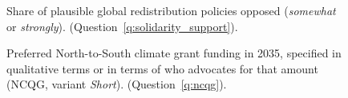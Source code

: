 \begin{figure}[h!]
    \caption[Share of plausible global policies opposed]{Share of plausible global redistribution policies opposed (\textit{somewhat} or \textit{strongly}). (Question~\ref{q:solidarity_support}).
    }\label{fig:share_solidarity_opposed}
\end{figure}

\begin{figure}[h!]
    \caption[Preferred NCQG, variant \textit{Short}]{Preferred North-to-South climate grant funding in 2035, specified in qualitative terms or in terms of who advocates for that amount (NCQG, variant \textit{Short}). (Question~\ref{q:ncqg}).
    }\label{fig:ncqg}
\end{figure}


